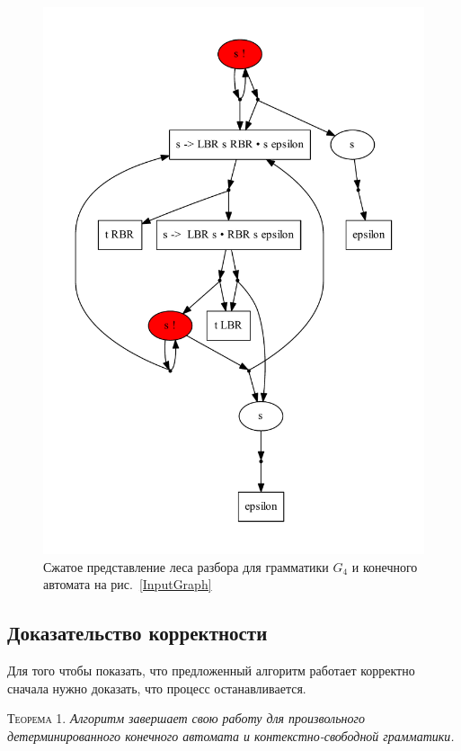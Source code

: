 \begin{figure}
 \centering
 \includegraphics[width=\textwidth]{Ragozina/pics/SppfExample.pdf}
 \caption{Сжатое представление леса разбора для грамматики $G_4$ и конечного автомата на рис.~\ref{InputGraph} }
 \label{ExSppf}
\end{figure}

\subsection{Доказательство корректности}
Для того чтобы показать, что предложенный алгоритм работает корректно сначала нужно доказать, что процесс останавливается.

\textsc{Теорема 1.} 
\textit{Алгоритм завершает свою работу для произвольного детерминированного конечного автомата и контекстно-свободной грамматики.}


